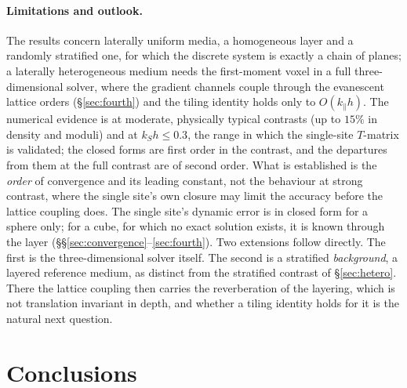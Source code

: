 \documentclass[extra,mreferee]{gji}
\begin{document}
\paragraph{Limitations and outlook.} The results concern laterally uniform media, a homogeneous layer
and a randomly stratified one, for which the discrete system is exactly a chain of planes; a laterally heterogeneous medium needs the
first-moment voxel in a full three-dimensional solver, where the gradient channels couple through
the evanescent lattice orders (\S\ref{sec:fourth}) and the tiling identity holds only to
$O(k_\parallel h)$. The numerical evidence is at moderate, physically typical contrasts (up to
$15\%$ in density and moduli) and at $k_Sh\le0.3$, the range in which the single-site $T$-matrix is
validated; the closed forms are first order in the contrast, and the departures from them at the
full contrast are of second order. What is established is the \emph{order} of convergence and its
leading constant, not the behaviour at strong contrast, where the single site's own closure may
limit the accuracy before the lattice coupling does. The single site's dynamic error is in closed
form for a sphere only; for a cube, for which no exact solution exists, it is known through the
layer (\S\S\ref{sec:convergence}--\ref{sec:fourth}). Two extensions follow directly. The first is
the three-dimensional solver itself. The second is a stratified \emph{background}, a layered
reference medium, as distinct from the stratified contrast of \S\ref{sec:hetero}. There the lattice coupling
then carries the reverberation of the layering, which is not translation invariant in depth, and
whether a tiling identity holds for it is the natural next question.

\section{Conclusions}\label{sec:summary}
\end{document}
